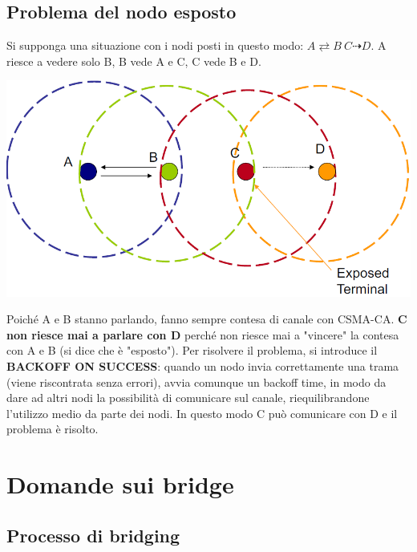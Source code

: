 \documentclass[12pt]{article}
\begin{document}
\subsection{Problema del nodo esposto}

Si supponga una situazione con i nodi posti in questo modo: $A \rightleftarrows B\ C \dashrightarrow D$. A riesce a vedere solo B, B vede A e C, C vede B e D.
\begin{center}
    \includegraphics[scale=0.35]{exposed_terminal_problem}
\end{center}
Poiché A e B stanno parlando, fanno sempre contesa di canale con CSMA-CA. \textbf{C non riesce mai a parlare con D} perché non riesce mai a "vincere" la contesa con A e B (si dice che è "esposto"). Per risolvere il problema, si introduce il \textbf{BACKOFF ON SUCCESS}: quando un nodo invia correttamente una trama (viene riscontrata senza errori), avvia comunque un backoff time, in modo da dare ad altri nodi la possibilità di comunicare sul canale, riequilibrandone l'utilizzo medio da parte dei nodi. In questo modo C può comunicare con D e il problema è risolto.

\section{Domande sui bridge}

\subsection{Processo di bridging}
\end{document}
